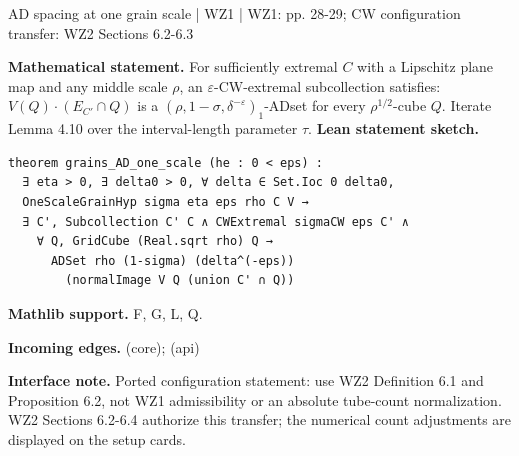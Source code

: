 \documentclass[10pt,a4paper]{article}
\newcommand{\nodecard}[1]{\hyperlink{node-#1}{\texttt{\detokenize{#1}}}}
\begin{document}
\begin{minipage}{\linewidth}
\hypertarget{node-L4_11}{}
\begin{tcolorbox}[colback=white,colframe=grainsfg,colbacktitle=grainsbg,coltitle=ink,boxrule=0.45pt,arc=1.6mm,left=3mm,right=3mm,top=2mm,bottom=2mm,title={\sffamily\bfseries WZ1 Lemma 4.11 / CW \hfill \texttt{L4\_11}}]
{\sffamily\small\color{muted}AD spacing at one grain scale | WZ1 | WZ1: pp. 28-29; CW configuration transfer: WZ2 Sections 6.2-6.3}\par
\textbf{Mathematical statement.} For sufficiently extremal $C$ with a Lipschitz plane map and any middle scale $\rho$, an $\varepsilon$-CW-extremal subcollection satisfies:
$V(Q)\cdot(E_{C'}\cap Q)$ is a $(\rho,1-\sigma,\delta^{-\varepsilon})_1$-ADset for every $\rho^{1/2}$-cube $Q$.
Iterate Lemma 4.10 over the interval-length parameter $\tau$.
\smallskip\textbf{Lean statement sketch.}
\begin{Verbatim}[fontsize=\small,breaklines=true,breakanywhere=true,tabsize=2]
theorem grains_AD_one_scale (he : 0 < eps) :
  ∃ eta > 0, ∃ delta0 > 0, ∀ delta ∈ Set.Ioc 0 delta0,
  OneScaleGrainHyp sigma eta eps rho C V →
  ∃ C', Subcollection C' C ∧ CWExtremal sigmaCW eps C' ∧
    ∀ Q, GridCube (Real.sqrt rho) Q →
      ADSet rho (1-sigma) (delta^(-eps))
        (normalImage V Q (union C' ∩ Q))
\end{Verbatim}
{\footnotesize\textbf{Mathlib support.} F, G, L, Q.\par
\textbf{Incoming edges.} \nodecard{L4_10} (core); \nodecard{Iparams} (api)\par}
{\footnotesize\textbf{Interface note.}  Ported configuration statement: use WZ2 Definition 6.1 and Proposition 6.2, not WZ1 admissibility or an absolute tube-count normalization. WZ2 Sections 6.2-6.4 authorize this transfer; the numerical count adjustments are displayed on the setup cards.}
\end{tcolorbox}\end{minipage}\par\medskip
\end{document}

